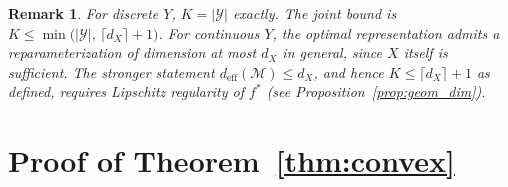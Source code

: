 \documentclass[11pt]{article}
\newtheorem{remark}{Remark}
\begin{document}
\begin{remark}
For discrete $Y$, $K=|\mathcal{Y}|$ exactly. The joint bound is
$K\leq\min\bigl(|\mathcal{Y}|,\,\lceil d_X\rceil+1\bigr)$.
For continuous $Y$, the optimal representation admits a
reparameterization of dimension at most $d_X$ in general, since $X$
itself is sufficient.
The stronger statement $d_{\mathrm{eff}}(\mathcal{M})\leq d_X$,
and hence $K\leq\lceil d_X\rceil+1$ as defined, requires Lipschitz
regularity of $f^*$ (see Proposition~\ref{prop:geom_dim}).
\end{remark}

\section{Proof of Theorem~\ref{thm:convex}}
\label{app:convexity}
\end{document}
